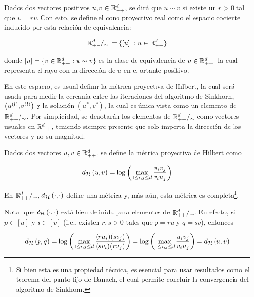 \begin{defn}
	\label{defn:projective_cone}
	Dados dos vectores positivos $u,v\in\mathbb{R}^d_{++}$, se dirá que $u\sim v$ si existe un $r>0$ tal que $u=rv$. Con esto, se define el cono proyectivo real como el espacio cociente inducido por esta relación de equivalencia:

	\begin{equation*}
		\mathbb{R}^{d}_{++}/_\sim\, = \{[u]\,:\, u\in\mathbb{R}^d_{++}\}
	\end{equation*}

	donde $[u]=\{v\in\mathbb{R}_{++}^d:u\sim v\}$ es la clase de equivalencia de $u\in\mathbb{R}^d_{++}$, la cual representa el rayo con la dirección de $u$ en el ortante positivo.
\end{defn}

En este espacio, es usual definir la métrica proyectiva de Hilbert, la cual será usada para medir la cercanía entre las iteraciones del algoritmo de Sinkhorn, $\left(u^{(l)}, v^{(l)}\right)$ y la solución $(u^*,v^*)$, la cual es única vista como un elemento de $\mathbb{R}^{d}_{++}/_\sim$. Por simplicidad, se denotarán los elementos de $\mathbb{R}^{d}_{++}/_\sim$ como vectores usuales en $\mathbb{R}_{++}^d$, teniendo siempre presente que solo importa la dirección de los vectores y no su magnitud.

\begin{prop}
	Dados dos vectores $u,v\in\mathbb{R}^d_{++}$, se define la métrica proyectiva de Hilbert como

	\begin{equation}
		\label{eq:hilbert_metric}
		d_{\mathcal{H}}\left(u,v\right) = \log\left(\max_{1\leq i,j\leq d} \frac{u_i v_j}{v_i u_j}\right)
	\end{equation}

	En $\mathbb{R}^{d}_{++}/_\sim$, $d_{\mathcal{H}}\left(\cdot,\cdot\right)$ define una métrica y, más aún, esta métrica es completa\footnote{Si bien esta es una propiedad técnica, es esencial para usar resultados como el teorema del punto fijo de Banach, el cual permite concluir la convergencia del algoritmo de Sinkhorn.}.

\end{prop}

Notar que $d_{\mathcal{H}}\left(\cdot,\cdot\right)$ está bien definida para elementos de $\mathbb{R}^{d}_{++}/_\sim$. En efecto, si $p\in[u]$ y $q\in[v]$ (i.e., existen $r,s>0$ tales que $p=ru$ y $q=sv$), entonces:

\begin{equation*}
	d_{\mathcal{H}}\left(p,q\right)
	= \log\left(\max_{1\leq i,j\leq d} \frac{(ru_i)(sv_j)}{(sv_i)(ru_j)}\right)
	= \log\left(\max_{1\leq i,j\leq d} \frac{u_i v_j}{v_i u_j}\right)
	= d_{\mathcal{H}}\left(u,v\right)
\end{equation*}

